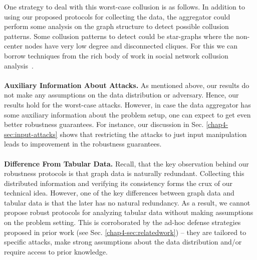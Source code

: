 One strategy to deal with this worst-case collusion is as follows. In addition to using our proposed protocols for collecting the data, the aggregator could perform some analysis on the graph structure to detect possible collusion patterns. Some collusion patterns to detect could be star-graphs where the non-center nodes have very low degree and disconnected cliques. For this we can borrow techniques from the rich body of work in social network collusion analysis~\cite{zhang2004making, shenEnhancing2016, arora2020analyzing, dutta2022blackmarket}. \vspace{-0.2cm}  \\\\
\noindent\textbf{Auxiliary Information About Attacks.} As mentioned above, our results do not make any assumptions on the data distribution or adversary. Hence, our results hold for the worst-case attacks. However, in case the data aggregator has some auxiliary information about the problem setup, one can expect to get even better robustness guarantees. For instance, our discussion in Sec. \ref{chap4-sec:input-attacks} shows that  restricting the attacks to just input manipulation leads to improvement in the robustness guarantees.   \vspace{-0.2cm}  \\\\%
  \noindent\textbf{Difference From Tabular Data.} Recall, that the key observation behind our robustness protocols is that graph data is naturally redundant. Collecting this distributed information and verifying its consistency forms the crux of our technical idea. However, one of the key differences between graph data and tabular data is that the later has no natural redundancy. As a result, we cannot propose robust protocols for analyzing tabular data without making assumptions on the problem setting. This is corroborated by the ad-hoc defense strategies proposed in prior work (see Sec. \ref{chap4-sec:relatedwork}) -- they are tailored to specific attacks, make strong assumptions about the data distribution and/or require access to prior knowledge. 


\begin{comment}
\begin{enumerate}
    \item Tabular data; difference with tabular data defense strategies
    \item Attack info can give better guarantees
    \item Adversary collusion - no assumption about data distribution, also that $m$ is unavoidable.
\end{enumerate}
\end{comment}


